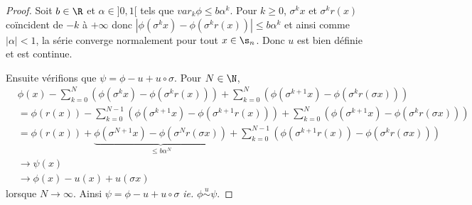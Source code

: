   \begin{proof}
    Soit $b \in \R$ et $\alpha \in ]0, 1[$ tels que $var_k\phi \leq b\alpha^k$.
    Pour $k \geq 0$, $\sigma^k x$ et $\sigma^k r(x)$ coïncident de $-k$ à $+\infty$ donc
    $\left|\phi(\sigma^k x) - \phi(\sigma^k r(x))\right| \leq b\alpha^k$ et ainsi comme $|\alpha| < 1$, la série converge normalement
    pour tout $x \in \s_n$. Donc $u$ est bien définie et est continue.

    Ensuite vérifions que $\psi = \phi - u + u \circ \sigma$. Pour $N \in \N$,
    \begin{align*}
      &\phi(x) - \sum_{k=0}^{N}{\left(\phi(\sigma^k x)    - \phi(\sigma^k r(x))\right)}
	       + \sum_{k=0}^{N}{\left(\phi(\sigma^{k+1}x) - \phi(\sigma^k r(\sigma x))\right)} \\
      &= \phi(r(x)) - \sum_{k=0}^{N-1}{\left(\phi(\sigma^{k+1} x) - \phi(\sigma^{k+1} r(x))\right)}
		    + \sum_{k=0}^{N}{\left(\phi(\sigma^{k+1}x) 	  - \phi(\sigma^k r(\sigma x))\right)} \\
      &= \phi(r(x)) + \underbrace{\phi(\sigma^{N+1}x) - \phi(\sigma^N r(\sigma x))}_{\leq b\alpha^N}
		    + \sum_{k=0}^{N-1}{\left(\phi(\sigma^{k+1}r(x)) - \phi(\sigma^k r(\sigma x)) \right)} \\
      &\longrightarrow \psi(x) \\
      &\longrightarrow \phi(x) - u(x) + u(\sigma x)
    \end{align*}
    lorsque $N \to \infty$. Ainsi $\psi = \phi - u + u\circ\sigma$ \textit{ie.} $\phi \overset{u}{\sim} \psi$.


\end{proof}
